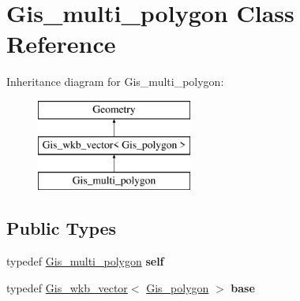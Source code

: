 \hypertarget{classGis__multi__polygon}{}\section{Gis\+\_\+multi\+\_\+polygon Class Reference}
\label{classGis__multi__polygon}
Inheritance diagram for Gis\+\_\+multi\+\_\+polygon\+:\begin{figure}[H]
\begin{center}
\leavevmode
\includegraphics[height=3.000000cm]{classGis__multi__polygon}
\end{center}
\end{figure}
\subsection*{Public Types}
\begin{DoxyCompactItemize}
\item 
\mbox{\label{classGis__multi__polygon_a0ea4e892a22be855c88a9f24a3b2684b}} 
typedef \mbox{\hyperlink{classGis__multi__polygon}{Gis\+\_\+multi\+\_\+polygon}} {\bfseries self}
\item 
\mbox{\label{classGis__multi__polygon_a32dbe2e82bef9acb3b3c75a4a034cc31}} 
typedef \mbox{\hyperlink{classGis__wkb__vector}{Gis\+\_\+wkb\+\_\+vector}}$<$ \mbox{\hyperlink{classGis__polygon}{Gis\+\_\+polygon}} $>$ {\bfseries base}
\end{DoxyCompactItemize}
